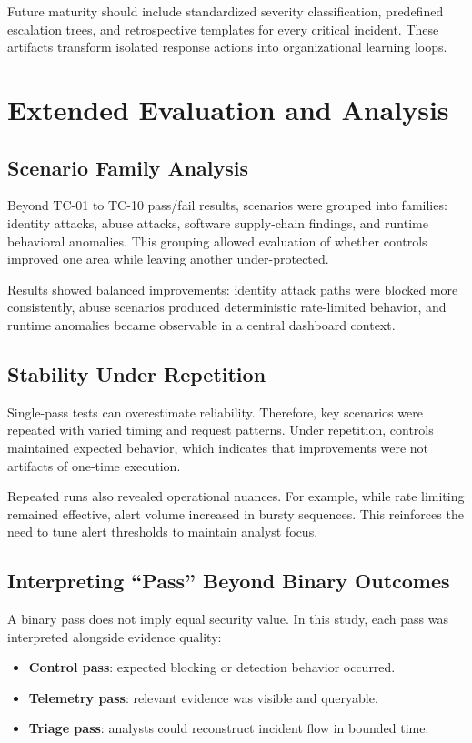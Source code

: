 \documentclass[conference]{IEEEtran}
\begin{document}
Future maturity should include standardized severity classification, predefined escalation trees, and retrospective templates for every critical incident. These artifacts transform isolated response actions into organizational learning loops.

\section{Extended Evaluation and Analysis}
\subsection{Scenario Family Analysis}
Beyond TC-01 to TC-10 pass/fail results, scenarios were grouped into families: identity attacks, abuse attacks, software supply-chain findings, and runtime behavioral anomalies. This grouping allowed evaluation of whether controls improved one area while leaving another under-protected.

Results showed balanced improvements: identity attack paths were blocked more consistently, abuse scenarios produced deterministic rate-limited behavior, and runtime anomalies became observable in a central dashboard context.

\subsection{Stability Under Repetition}
Single-pass tests can overestimate reliability. Therefore, key scenarios were repeated with varied timing and request patterns. Under repetition, controls maintained expected behavior, which indicates that improvements were not artifacts of one-time execution.

Repeated runs also revealed operational nuances. For example, while rate limiting remained effective, alert volume increased in bursty sequences. This reinforces the need to tune alert thresholds to maintain analyst focus.

\subsection{Interpreting ``Pass'' Beyond Binary Outcomes}
A binary pass does not imply equal security value. In this study, each pass was interpreted alongside evidence quality:
\begin{itemize}
\item \textbf{Control pass}: expected blocking or detection behavior occurred.
\item \textbf{Telemetry pass}: relevant evidence was visible and queryable.
\item \textbf{Triage pass}: analysts could reconstruct incident flow in bounded time.
\end{itemize}
\end{document}
